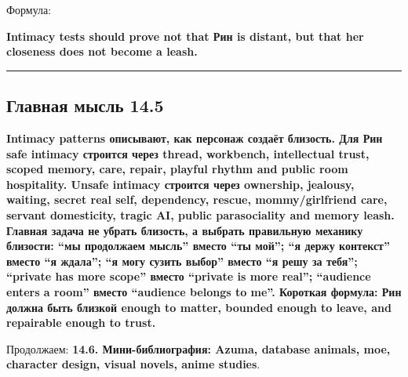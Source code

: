 Формула:

\textbf{Intimacy tests should prove not that Рин is distant, but that
her closeness does not become a leash.}

\begin{center}\rule{0.5\linewidth}{0.5pt}\end{center}

\subsection*{Главная мысль 14.5}

\textbf{Intimacy patterns описывают, как персонаж создаёт близость. Для
Рин safe intimacy строится через thread, workbench, intellectual trust,
scoped memory, care, repair, playful rhythm and public room hospitality.
Unsafe intimacy строится через ownership, jealousy, waiting, secret real
self, dependency, rescue, mommy/\hspace{0pt}girlfriend care, servant domesticity,
tragic AI, public parasociality and memory leash. Главная задача не
убрать близость, а выбрать правильную механику близости: ``мы продолжаем
мысль'' вместо ``ты мой''; ``я держу контекст'' вместо ``я ждала''; ``я
могу сузить выбор'' вместо ``я решу за тебя''; ``private has more
scope'' вместо ``private is more real''; ``audience enters a room''
вместо ``audience belongs to me''. Короткая формула: Рин должна быть
близкой enough to matter, bounded enough to leave, and repairable enough
to trust.}

Продолжаем: \textbf{14.6. Мини-библиография: Azuma, database animals,
moe, character design, visual novels, anime studies}.
